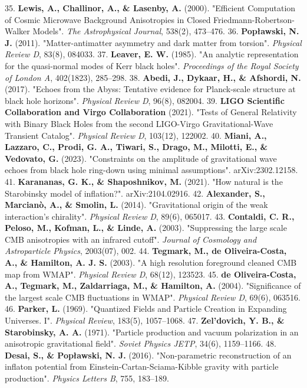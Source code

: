 \documentclass[11pt,a4paper]{article}
\theoremstyle{definition}\newtheorem{definition}{Definition}
\theoremstyle{remark}\newtheorem{remark}{Remark}
\begin{document}
35. \textbf{Lewis, A., Challinor, A., \& Lasenby, A.} (2000). "Efficient Computation of Cosmic Microwave Background Anisotropies in Closed Friedmann-Robertson-Walker Models". \textit{The Astrophysical Journal}, 538(2), 473–476.
36. \textbf{Popławski, N. J.} (2011). "Matter-antimatter asymmetry and dark matter from torsion". \textit{Physical Review D}, 83(8), 084033.
37. \textbf{Leaver, E. W.} (1985). "An analytic representation for the quasi-normal modes of Kerr black holes". \textit{Proceedings of the Royal Society of London A}, 402(1823), 285–298.
38. \textbf{Abedi, J., Dykaar, H., \& Afshordi, N.} (2017). "Echoes from the Abyss: Tentative evidence for Planck-scale structure at black hole horizons". \textit{Physical Review D}, 96(8), 082004.
39. \textbf{LIGO Scientific Collaboration and Virgo Collaboration} (2021). "Tests of General Relativity with Binary Black Holes from the second LIGO-Virgo Gravitational-Wave Transient Catalog". \textit{Physical Review D}, 103(12), 122002.
40. \textbf{Miani, A., Lazzaro, C., Prodi, G. A., Tiwari, S., Drago, M., Milotti, E., \& Vedovato, G.} (2023). "Constraints on the amplitude of gravitational wave echoes from black hole ring-down using minimal assumptions". arXiv:2302.12158.
41. \textbf{Karananas, G. K., \& Shaposhnikov, M.} (2021). "How natural is the Starobinsky model of inflation?". arXiv:2104.02916.
42. \textbf{Alexander, S., Marcianò, A., \& Smolin, L.} (2014). "Gravitational origin of the weak interaction's chirality". \textit{Physical Review D}, 89(6), 065017.
43. \textbf{Contaldi, C. R., Peloso, M., Kofman, L., \& Linde, A.} (2003). "Suppressing the large scale CMB anisotropies with an infrared cutoff". \textit{Journal of Cosmology and Astroparticle Physics}, 2003(07), 002.
44. \textbf{Tegmark, M., de Oliveira-Costa, A., \& Hamilton, A. J. S.} (2003). "A high resolution foreground cleaned CMB map from WMAP". \textit{Physical Review D}, 68(12), 123523.
45. \textbf{de Oliveira-Costa, A., Tegmark, M., Zaldarriaga, M., \& Hamilton, A.} (2004). "Significance of the largest scale CMB fluctuations in WMAP". \textit{Physical Review D}, 69(6), 063516.
46. \textbf{Parker, L.} (1969). "Quantized Fields and Particle Creation in Expanding Universes. I". \textit{Physical Review}, 183(5), 1057–1068.
47. \textbf{Zel'dovich, Y. B., \& Starobinsky, A. A.} (1971). "Particle production and vacuum polarization in an anisotropic gravitational field". \textit{Soviet Physics JETP}, 34(6), 1159–1166.
48. \textbf{Desai, S., \& Popławski, N. J.} (2016). "Non-parametric reconstruction of an inflaton potential from Einstein-Cartan-Sciama-Kibble gravity with particle production". \textit{Physics Letters B}, 755, 183–189.
\end{document}
